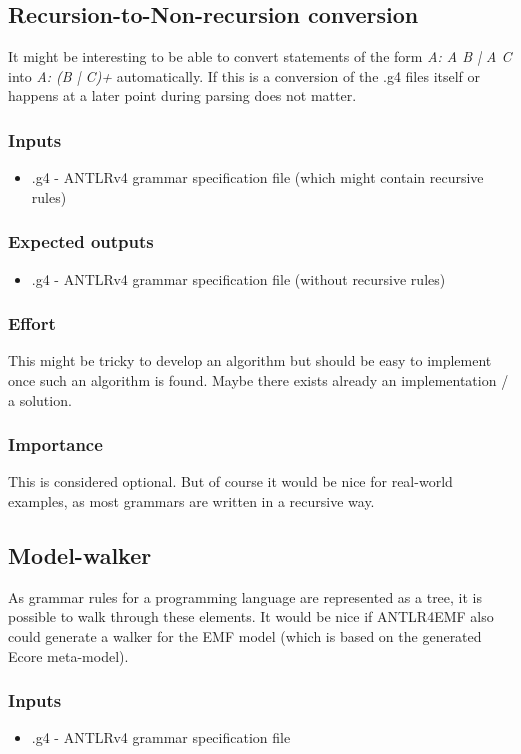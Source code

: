 \subsection{Recursion-to-Non-recursion conversion}
It might be interesting to be able to convert
statements of the form {\it A: A B | A C}
into {\it A: (B | C)+} automatically. 
If this is a conversion of the .g4 files itself
or happens at a later point during parsing does not
matter.
\subsubsection{Inputs}
\begin{itemize}
	\item .g4 - ANTLRv4 grammar specification file
	(which might contain recursive rules)
\end{itemize}
\subsubsection{Expected outputs}
\begin{itemize}
		\item .g4 - ANTLRv4 grammar specification file
		(without recursive rules)
\end{itemize}
\subsubsection{Effort}
This might be tricky to develop an algorithm but
should be easy to implement once such an algorithm is found.
Maybe there exists already an implementation / a solution.
\subsubsection{Importance}
This is considered optional. But of course it would be nice
for real-world examples, as most grammars are written in
a recursive way.

\subsection{Model-walker}
As grammar rules for a programming language
are represented as a tree, it is possible
to walk through these elements. It would be 
nice if ANTLR4EMF also could generate a
walker for the EMF model (which is based
on the generated Ecore meta-model).
\subsubsection{Inputs}
\begin{itemize}
	\item .g4 - ANTLRv4 grammar specification file
\end{itemize}
